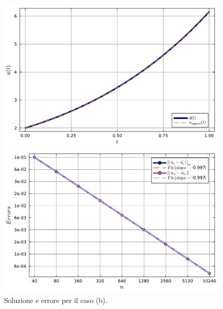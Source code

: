 \documentclass[letterpaper, 12pt]{article}
\begin{document}
\begin{figure}[!ht]
    \centering
    \begin{minipage}[b]{0.47\textwidth}
        \includegraphics[width=\textwidth]{6223.pdf}
    \end{minipage}
    \hspace{0.5cm}
    \begin{minipage}[b]{0.47\textwidth}
        \includegraphics[width=\textwidth]{6224.pdf}
    \end{minipage}
    \caption{Soluzione e errore per il caso (b).}
    \label{fig:es6_2_1_2}
\end{figure}
\end{document}
